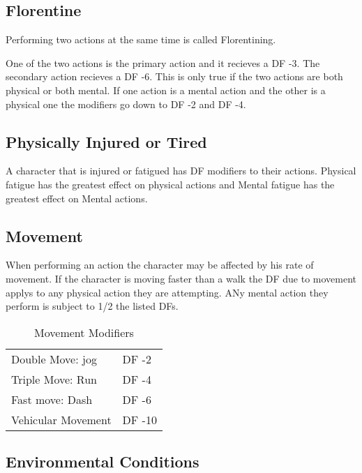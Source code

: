 \subsection{Florentine}

Performing two actions at the same time is called Florentining.

One of the two actions is the primary action and it recieves a 
DF -3. The secondary action recieves a DF -6. This is only true 
if the two actions are both physical or both mental. If one 
action is a mental action and the other is a physical one the modifiers
go down to DF -2 and DF -4.



\subsection{Physically Injured or Tired}

A character that is injured or fatigued has DF modifiers to 
their actions. Physical fatigue has the greatest effect on physical actions 
and Mental fatigue has the greatest effect on Mental actions.




\subsection{Movement} 

When performing an action the character may be affected by 
his rate of movement. If the character is moving faster than a 
walk the DF due to movement applys to any physical action they are 
attempting. ANy mental action they perform is subject to 1/2 
the listed DFs.

\begin{table}[h]
	\begin{tabular}{ll}
	Double Move: jog							  & DF -2 \\
	Triple Move: Run							  & DF -4 \\
	Fast move: Dash							 & DF -6\\
	Vehicular Movement							& DF -10 \\ 
    \end{tabular}
    \caption{Movement Modifiers}
\end{table}

\subsection{Environmental Conditions}


